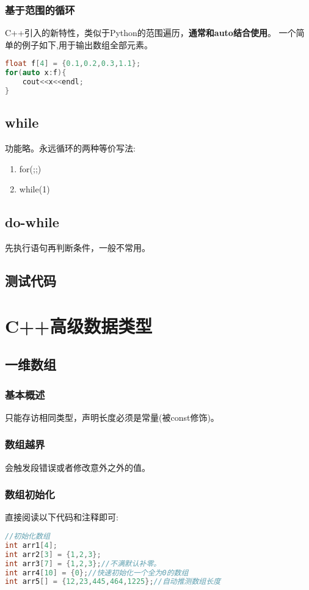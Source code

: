 \documentclass{article}
\begin{document}
    \subsubsection{基于范围的循环}
    C++引入的新特性，类似于Python的范围遍历，\textbf{通常和auto结合使用}。
    一个简单的例子如下,用于输出数组全部元素。
    \begin{lstlisting}[language=c++]
float f[4] = {0.1,0.2,0.3,1.1};
for(auto x:f){
    cout<<x<<endl;
}
    \end{lstlisting}

    \subsection{while}
    功能略。永远循环的两种等价写法:
    \begin{enumerate}
        \item for(;;)
        \item while(1)
    \end{enumerate}

    \subsection{do-while}
    先执行语句再判断条件，一般不常用。

    \subsection{测试代码}
    
    
    \section{C++高级数据类型}
    \subsection{一维数组}
    \subsubsection{基本概述}
    只能存访相同类型，声明长度必须是常量(被const修饰)。
    \subsubsection{数组越界}
    会触发段错误或者修改意外之外的值。
    \subsubsection{数组初始化}
    直接阅读以下代码和注释即可:
    \begin{lstlisting}[language=c++]
//初始化数组
int arr1[4];
int arr2[3] = {1,2,3};
int arr3[7] = {1,2,3};//不满默认补零。
int arr4[10] = {0};//快速初始化一个全为0的数组
int arr5[] = {12,23,445,464,1225};//自动推测数组长度 
    \end{lstlisting}
\end{document}
